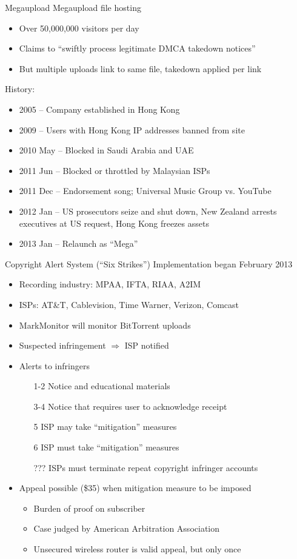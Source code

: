 \documentclass{beamer}
\begin{document}
\begin{frame}{Megaupload}
Megaupload file hosting
\begin{itemize}
\item Over 50,000,000 visitors per day
\item Claims to ``swiftly process legitimate DMCA takedown notices''
\item But multiple uploads link to same file, takedown applied per link
\end{itemize}
History:
\begin{itemize}
\item 2005 -- Company established in Hong Kong
\item 2009 -- Users with Hong Kong IP addresses banned from site
\item 2010 May -- Blocked in Saudi Arabia and UAE
\item 2011 Jun -- Blocked or throttled by Malaysian ISPs
\item 2011 Dec -- Endorsement song; Universal Music Group vs. YouTube
\item 2012 Jan -- US prosecutors seize and shut down, New Zealand arrests executives at US request, Hong Kong freezes assets
\item 2013 Jan -- Relaunch as ``Mega''
\end{itemize}
\end{frame}

\begin{frame}{Copyright Alert System (``Six Strikes'')}
Implementation began February 2013
\begin{itemize}
\item Recording industry: MPAA, IFTA, RIAA, A2IM
\item ISPs: AT\&T, Cablevision, Time Warner, Verizon, Comcast
\item MarkMonitor will monitor BitTorrent uploads
\item Suspected infringement $\Rightarrow$ ISP notified
\item Alerts to infringers
\begin{enumerate}
\item[1-2] Notice and educational materials
\item[3-4] Notice that requires user to acknowledge receipt
\item[5] ISP may take ``mitigation'' measures
\item[6] ISP must take ``mitigation'' measures
\item[???] ISPs must terminate repeat copyright infringer accounts
\end{enumerate}
\item Appeal possible (\$35) when mitigation measure to be imposed
\begin{itemize}
\item Burden of proof on subscriber
\item Case judged by American Arbitration Association
\item Unsecured wireless router is valid appeal, but only once
\end{itemize}
\end{itemize}
\end{frame}
\end{document}

